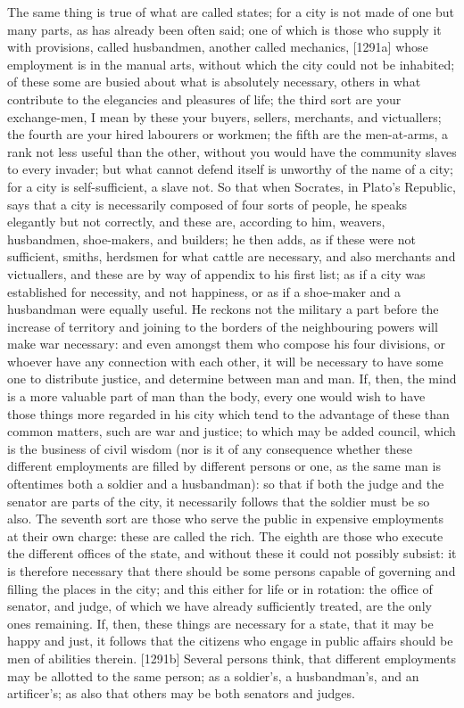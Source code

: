 The same thing is true of what are called states; for a city is not made
of one but many parts, as has already been often said; one of which is
those who supply it with provisions, called husbandmen, another called
mechanics, [1291a] whose employment is in the manual arts, without which
the city could not be inhabited; of these some are busied about what is
absolutely necessary, others in what contribute to the elegancies and
pleasures of life; the third sort are your exchange-men, I mean by these
your buyers, sellers, merchants, and victuallers; the fourth are your
hired labourers or workmen; the fifth are the men-at-arms, a rank not less
useful than the other, without you would have the community slaves to
every invader; but what cannot defend itself is unworthy of the name of a
city; for a city is self-sufficient, a slave not. So that when Socrates,
in Plato's Republic, says that a city is necessarily composed of four
sorts of people, he speaks elegantly but not correctly, and these are,
according to him, weavers, husbandmen, shoe-makers, and builders; he then
adds, as if these were not sufficient, smiths, herdsmen for what cattle
are necessary, and also merchants and victuallers, and these are by way of
appendix to his first list; as if a city was established for necessity,
and not happiness, or as if a shoe-maker and a husbandman were equally
useful. He reckons not the military a part before the increase of
territory and joining to the borders of the neighbouring powers will make
war necessary: and even amongst them who compose his four divisions, or
whoever have any connection with each other, it will be necessary to have
some one to distribute justice, and determine between man and man. If,
then, the mind is a more valuable part of man than the body, every one
would wish to have those things more regarded in his city which tend to
the advantage of these than common matters, such are war and justice; to
which may be added council, which is the business of civil wisdom (nor is
it of any consequence whether these different employments are filled by
different persons or one, as the same man is oftentimes both a soldier and
a husbandman): so that if both the judge and the senator are parts of the
city, it necessarily follows that the soldier must be so also. The seventh
sort are those who serve the public in expensive employments at their own
charge: these are called the rich. The eighth are those who execute the
different offices of the state, and without these it could not possibly
subsist: it is therefore necessary that there should be some persons
capable of governing and filling the places in the city; and this either
for life or in rotation: the office of senator, and judge, of which we
have already sufficiently treated, are the only ones remaining. If, then,
these things are necessary for a state, that it may be happy and just, it
follows that the citizens who engage in public affairs should be men of
abilities therein. [1291b] Several persons think, that different
employments may be allotted to the same person; as a soldier's, a
husbandman's, and an artificer's; as also that others may be both senators
and judges.

